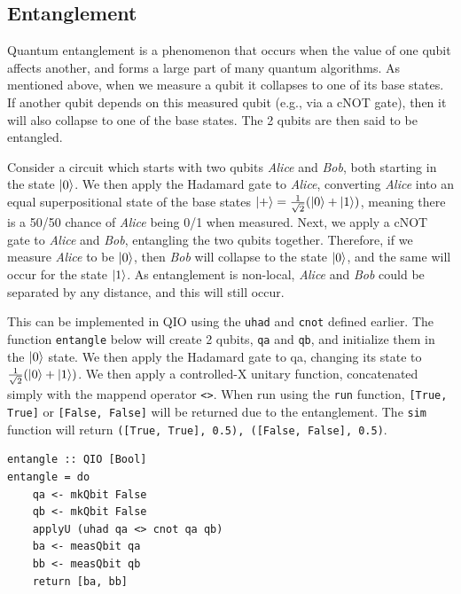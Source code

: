 \documentclass[a4paper,11pt, titlepage, twoside]{article}
\begin{document}
\subsection{Entanglement}
Quantum entanglement is a phenomenon that occurs when the value of one qubit affects another, and forms a large part of many quantum algorithms. As mentioned above, when we measure a qubit it collapses to one of its base states. If another qubit depends on this measured qubit (e.g., via a cNOT gate), then it will also collapse to one of the base states. The 2 qubits are then said to be entangled. \par
Consider a circuit which starts with two qubits \textit{Alice} and \textit{Bob}, both starting in the state $\ket{0}$. We then apply the Hadamard gate to \textit{Alice}, converting \textit{Alice} into an equal superpositional state of the base states $\ket{+} = \frac{1}{\sqrt{2}}(\ket{0} + \ket{1})$, meaning there is a 50/50 chance of \textit{Alice} being 0/1 when measured. Next, we apply a cNOT gate to \textit{Alice} and \textit{Bob}, entangling the two qubits together. Therefore, if we measure \textit{Alice} to be $\ket{0}$, then \textit{Bob} will collapse to the state $\ket{0}$, and the same will occur for the state $\ket{1}$. As entanglement is non-local, \textit{Alice} and \textit{Bob} could be separated by any distance, and this will still occur.\par
This can be implemented in QIO using the \texttt{uhad} and \texttt{cnot} defined earlier. The function \texttt{entangle} below will create 2 qubits, \texttt{qa} and \texttt{qb}, and initialize them in the $\ket{0}$ state. We then apply the Hadamard gate to qa, changing its state to $\frac{1}{\sqrt{2}}(\ket{0} + \ket{1})$. We then apply a controlled-X unitary function, concatenated simply with the mappend operator \texttt{<>}. When run using the \texttt{run} function, \texttt{[True, True]} or \texttt{[False, False]} will be returned due to the entanglement. The \texttt{sim} function will return \texttt{([True, True], 0.5), ([False, False], 0.5)}.\par
\begin{verbatim}
entangle :: QIO [Bool]
entangle = do
    qa <- mkQbit False
    qb <- mkQbit False
    applyU (uhad qa <> cnot qa qb)
    ba <- measQbit qa
    bb <- measQbit qb
    return [ba, bb]
\end{verbatim}
\end{document}

